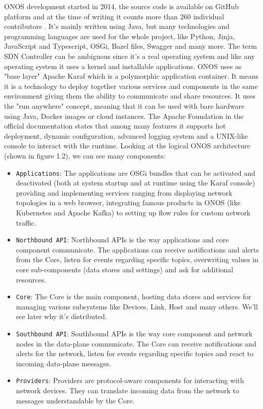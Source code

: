 ONOS development started in 2014, the source code is available on GitHub platform and at the time of writing it counts more than 260 individual contributors \cite{github-onos}. It's mainly written using Java, but many technologies and programming languages are used for the whole project, like Python, Jinja, JavaScript and Typescript, OSGi, Bazel files, Swagger and many more. The term SDN Controller can be ambiguous since it's a real operating system and like any operating system it uses a kernel and installable applications. ONOS uses as "base layer" Apache Karaf which is a polymorphic application container. It means it is a technology to deploy together various services and components in the same environment giving them the ability to communicate and share resources. It uses the "run anywhere" concept, meaning that it can be used with bare hardware using Java, Docker images or cloud instances. The Apache Foundation in the official documentation states that among many features it supports hot deployment, dynamic configuration, advanced logging system and a UNIX-like console to interact with the runtime. Looking at the logical ONOS architecture (shown in figure 1.2), we can see many components:

\begin{itemize}
  \item \texttt{Applications}: The applications are OSGi bundles that can be activated and deactivated (both at system startup and at runtime using the Karaf console) providing and implementing services ranging from displaying network topologies in a web browser, integrating famous products in ONOS (like Kubernetes and Apache Kafka) to setting up flow rules for custom network traffic.
  \item \texttt{Northbound API}: Northbound APIs is the way applications and core component communicate. The applications can receive notifications and alerts from the Core, listen for events regarding specific topics, overwriting values in core sub-components (data stores and settings) and ask for additional resources.
  \item \texttt{Core}: The Core is the main component, hosting data stores and services for managing various subsystems like Devices, Link, Host and many others. We'll see later why it's distributed. 
  \item \texttt{Southbound API}: Southbound APIs is the way core component and network nodes in the data-plane communicate. The Core can receive notifications and alerts for the network, listen for events regarding specific topics and react to incoming data-plane messages.
  \item \texttt{Providers}: Providers are protocol-aware components for interacting with network devices. They can translate incoming data from the network to messages understandable by the Core. 
\end{itemize}

